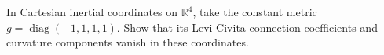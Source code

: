 In Cartesian inertial coordinates on \(\mathbb R^4\), take the constant metric
\(g=\operatorname{diag}(-1,1,1,1)\). Show that its Levi-Civita connection
coefficients and curvature components vanish in these coordinates.
